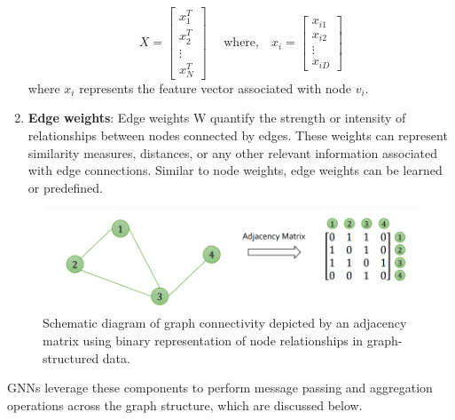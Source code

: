 \begin{enumerate}
\begin{equation*}
  X = \begin{bmatrix} x_1^T \\ x_2^T \\ \vdots \\ x_N^T \end{bmatrix} \quad \text{ where,} \quad x_i = \begin{bmatrix} x_{i1} \\ x_{i2} \\ \vdots \\ x_{iD} \end{bmatrix}
\end{equation*}
where \( x_i \) represents the feature vector associated with node \(v_i \).
  \item \textbf{Edge weights}: Edge weights \gls{W} quantify the strength or intensity of relationships between nodes connected by edges. These weights can represent similarity measures, distances, or any other relevant information associated with edge connections. Similar to node weights, edge weights can be learned or predefined. 
\end{enumerate}  
\begin{figure}[ht]
  \centering
  \includegraphics[width=12cm]{images/Theory-DL/AdjMat.png}
  \caption{Schematic diagram of graph connectivity depicted by an adjacency matrix using binary representation of node relationships in graph-structured data.}
  \label{fig:AdjMat}
\end{figure}
GNNs leverage these components to perform message passing and aggregation operations across the graph structure, which are discussed below. \\
